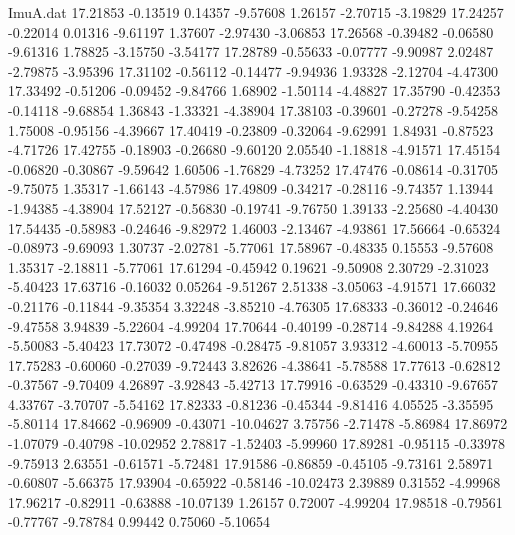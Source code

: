 \begin{filecontents}{ImuA.dat}
  17.21853   -0.13519    0.14357   -9.57608    1.26157   -2.70715   -3.19829
  17.24257   -0.22014    0.01316   -9.61197    1.37607   -2.97430   -3.06853
  17.26568   -0.39482   -0.06580   -9.61316    1.78825   -3.15750   -3.54177
  17.28789   -0.55633   -0.07777   -9.90987    2.02487   -2.79875   -3.95396
  17.31102   -0.56112   -0.14477   -9.94936    1.93328   -2.12704   -4.47300
  17.33492   -0.51206   -0.09452   -9.84766    1.68902   -1.50114   -4.48827
  17.35790   -0.42353   -0.14118   -9.68854    1.36843   -1.33321   -4.38904
  17.38103   -0.39601   -0.27278   -9.54258    1.75008   -0.95156   -4.39667
  17.40419   -0.23809   -0.32064   -9.62991    1.84931   -0.87523   -4.71726
  17.42755   -0.18903   -0.26680   -9.60120    2.05540   -1.18818   -4.91571
  17.45154   -0.06820   -0.30867   -9.59642    1.60506   -1.76829   -4.73252
  17.47476   -0.08614   -0.31705   -9.75075    1.35317   -1.66143   -4.57986
  17.49809   -0.34217   -0.28116   -9.74357    1.13944   -1.94385   -4.38904
  17.52127   -0.56830   -0.19741   -9.76750    1.39133   -2.25680   -4.40430
  17.54435   -0.58983   -0.24646   -9.82972    1.46003   -2.13467   -4.93861
  17.56664   -0.65324   -0.08973   -9.69093    1.30737   -2.02781   -5.77061
  17.58967   -0.48335    0.15553   -9.57608    1.35317   -2.18811   -5.77061
  17.61294   -0.45942    0.19621   -9.50908    2.30729   -2.31023   -5.40423
  17.63716   -0.16032    0.05264   -9.51267    2.51338   -3.05063   -4.91571
  17.66032   -0.21176   -0.11844   -9.35354    3.32248   -3.85210   -4.76305
  17.68333   -0.36012   -0.24646   -9.47558    3.94839   -5.22604   -4.99204
  17.70644   -0.40199   -0.28714   -9.84288    4.19264   -5.50083   -5.40423
  17.73072   -0.47498   -0.28475   -9.81057    3.93312   -4.60013   -5.70955
  17.75283   -0.60060   -0.27039   -9.72443    3.82626   -4.38641   -5.78588
  17.77613   -0.62812   -0.37567   -9.70409    4.26897   -3.92843   -5.42713
  17.79916   -0.63529   -0.43310   -9.67657    4.33767   -3.70707   -5.54162
  17.82333   -0.81236   -0.45344   -9.81416    4.05525   -3.35595   -5.80114
  17.84662   -0.96909   -0.43071  -10.04627    3.75756   -2.71478   -5.86984
  17.86972   -1.07079   -0.40798  -10.02952    2.78817   -1.52403   -5.99960
  17.89281   -0.95115   -0.33978   -9.75913    2.63551   -0.61571   -5.72481
  17.91586   -0.86859   -0.45105   -9.73161    2.58971   -0.60807   -5.66375
  17.93904   -0.65922   -0.58146  -10.02473    2.39889    0.31552   -4.99968
  17.96217   -0.82911   -0.63888  -10.07139    1.26157    0.72007   -4.99204
  17.98518   -0.79561   -0.77767   -9.78784    0.99442    0.75060   -5.10654

\end{filecontents}
